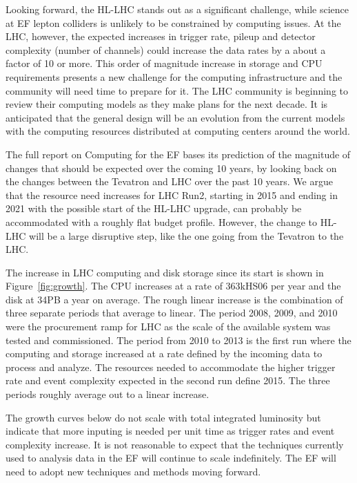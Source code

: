 Looking forward, the HL-LHC stands out as a significant challenge, while
science at EF lepton colliders is unlikely to be constrained by computing
issues.  At the LHC, however, the expected increases in trigger rate, pileup
and detector complexity (number of channels) could increase the data rates by
a about a factor of 10 or more.   This order of magnitude increase in storage
and CPU requirements presents a new challenge for the computing infrastructure
and the community will need time to prepare for it. The LHC community is
beginning to review their computing models as they make plans for the next
decade.  It is anticipated that the general design will be an evolution from
the current models with the computing resources distributed at computing
centers around the world.

The full report on Computing for the EF bases its  prediction of the magnitude
of changes that should be expected over the coming 10 years, by looking back
on  the changes between the Tevatron and LHC over the past 10 years. We argue
that  the resource need increases for LHC Run2, starting in 2015 and ending
in 2021 with the possible start of  the HL-LHC upgrade, can probably be
accommodated with a roughly flat budget profile. However, the change to HL-LHC
will be a large disruptive step, like the one going from the Tevatron to the
LHC.

The increase in LHC computing and disk storage since its start is shown in
Figure~\ref{fig:growth}.  The CPU increases at a rate of 363kHS06 per year and
the disk at 34PB a year on average.  The rough linear increase is the
combination of three separate periods that average to linear.  The period
2008, 2009, and 2010 were the procurement ramp for LHC as the scale of the
available system was tested and commissioned. The period from 2010 to 2013 is
the first run where the computing and storage increased at a rate defined by
the incoming data to process and analyze.  The resources needed to accommodate
the higher trigger rate and event complexity expected in the second run define
2015.  The three periods roughly average out to a linear increase.

The growth curves below do not scale with total integrated luminosity but
indicate that more inputing is needed per unit time as trigger rates and event
complexity increase. It is not reasonable to expect that the techniques
currently used to analysis data in the EF will continue to scale indefinitely.
The EF will need to adopt new techniques and methods moving forward.

